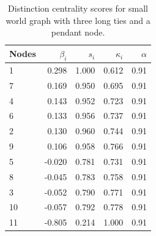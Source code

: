 \begin{table}
\centering
\caption{\label{tab:rege3}Distinction centrality scores for small world graph with three long ties and a pendant node.}
\centering
\begin{tabular}[t]{lrrrr}
\toprule
Nodes & $\beta_i$ & $s_i$ & $\kappa_i$ & $\alpha$\\
\midrule
1 & 0.298 & 1.000 & 0.612 & 0.91\\
7 & 0.169 & 0.950 & 0.695 & 0.91\\
4 & 0.143 & 0.952 & 0.723 & 0.91\\
6 & 0.133 & 0.956 & 0.737 & 0.91\\
2 & 0.130 & 0.960 & 0.744 & 0.91\\
9 & 0.106 & 0.958 & 0.766 & 0.91\\
5 & -0.020 & 0.781 & 0.731 & 0.91\\
8 & -0.045 & 0.783 & 0.758 & 0.91\\
3 & -0.052 & 0.790 & 0.771 & 0.91\\
10 & -0.057 & 0.792 & 0.778 & 0.91\\
11 & -0.805 & 0.214 & 1.000 & 0.91\\
\bottomrule
\end{tabular}
\end{table}
